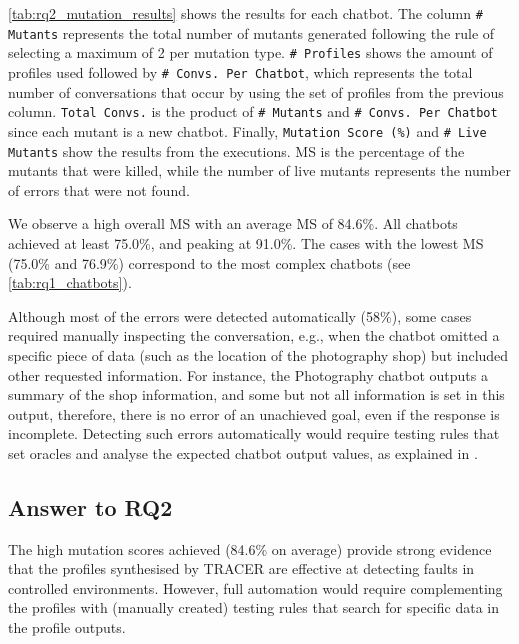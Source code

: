 \autoref{tab:rq2_mutation_results}
shows the results for each chatbot.
The column \texttt{\# Mutants} represents
the total number of mutants generated
following the rule of selecting a maximum of 2 per mutation type.
\texttt{\# Profiles} shows the amount of profiles used
followed by \texttt{\# Convs. Per Chatbot},
which represents the total number of conversations
that occur by using the set of profiles from the previous column.
\texttt{Total Convs.} is the product of
\texttt{\# Mutants} and \texttt{\# Convs. Per Chatbot}
since each mutant is a new chatbot.
Finally, \texttt{Mutation Score (\%)} and \texttt{\# Live Mutants}
show the results from the executions.
\ac{MS} is the percentage of the mutants that were killed,
while the number of live mutants
represents the number of errors that were not found.

We observe a high overall \acl{MS}
with an average \ac{MS} of 84.6\%.
All chatbots achieved at least 75.0\%,
and peaking at 91.0\%.
The cases with the lowest \ac{MS}
(75.0\% and 76.9\%)
correspond to the most complex chatbots
(see \autoref{tab:rq1_chatbots}).

Although most of the errors were detected automatically (58\%),
some cases required manually inspecting the conversation,
e.g., when the chatbot omitted a specific piece of data
(such as the location of the photography shop)
but included other requested information.
For instance, the Photography chatbot outputs a summary of the shop information,
and some but not all information is set in this output,
therefore, there is no error of an unachieved goal,
even if the response is incomplete.
Detecting such errors automatically
would require testing rules that set oracles
and analyse the expected chatbot output values,
as explained in \autocite{delaraSensei}.

\subsection{Answer to RQ2}

The high mutation scores achieved (84.6\% on average)
provide strong evidence
that the profiles synthesised by TRACER are effective
at detecting faults in controlled environments.
However, full automation would require
complementing the profiles with (manually created) testing rules
that search for specific data in the profile outputs.

